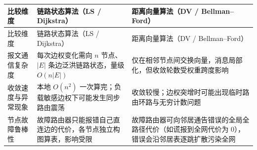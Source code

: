 \begingroup\small\setlength{\tabcolsep}{3pt}\renewcommand{\arraystretch}{1.22}
\begin{longtable}{@{}>{\raggedright\arraybackslash}p{}>{\raggedright\arraybackslash}p{}>{\raggedright\arraybackslash}p{}@{}}
\toprule
比较维度 & 链路状态算法（LS / Dijkstra） & 距离向量算法（DV / Bellman–Ford） \\
\midrule\endfirsthead
比较维度 & 链路状态算法（LS / Dijkstra） & 距离向量算法（DV / Bellman–Ford） \\
\midrule\endhead
\bottomrule\endfoot
报文通信复杂度 & 每次边权变化需向 $n$ 节点、$|E|$ 条边泛洪链路状态，量级 $O(n|E|)$ & 仅在相邻节点间交换向量，消息局部化，但收敛轮数受权重跨度影响 \\
收敛速度与异常现象 & 本地 $O(n^2)$ 一次算完；负载敏感边权下可能发生同步路由震荡 & 收敛较慢；边权突增时可能出现临时路由环路与无穷计数问题 \\
节点故障鲁棒性 & 故障路由器只能报错自己直连边的代价，各节点独立构图算表，影响受限 & 故障路由器可向邻居通告错误的全局全路径代价（如谎报到全网代价为 0），错误会沿邻居表逐跳扩散污染全网 \\
\end{longtable}\endgroup



